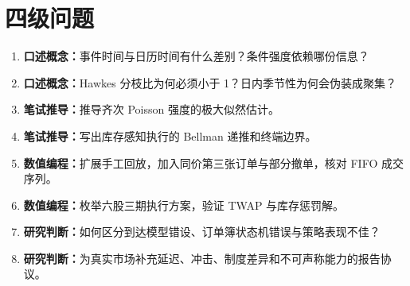 \section{四级问题}
\begin{enumerate}[leftmargin=*]
  \item \textbf{口述概念：}事件时间与日历时间有什么差别？条件强度依赖哪份信息？
  \item \textbf{口述概念：}Hawkes 分枝比为何必须小于 1？日内季节性为何会伪装成聚集？
  \item \textbf{笔试推导：}推导齐次 Poisson 强度的极大似然估计。
  \item \textbf{笔试推导：}写出库存感知执行的 Bellman 递推和终端边界。
  \item \textbf{数值编程：}扩展手工回放，加入同价第三张订单与部分撤单，核对 FIFO 成交序列。
  \item \textbf{数值编程：}枚举六股三期执行方案，验证 TWAP 与库存惩罚解。
  \item \textbf{研究判断：}如何区分到达模型错设、订单簿状态机错误与策略表现不佳？
  \item \textbf{研究判断：}为真实市场补充延迟、冲击、制度差异和不可声称能力的报告协议。
\end{enumerate}
